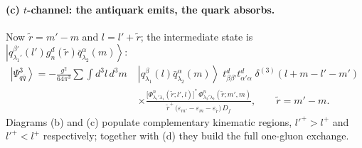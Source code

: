 \documentclass[11pt]{article}
\newcommand{\eps}{\varepsilon}
\newcommand{\dthree}{\delta^{(3)}}
\newcommand{\ket}[1]{\left|#1\right\rangle}
\newcommand{\Ph}{\Phi}
\newcommand{\qk}[3]{q^{#1}_{#2}(#3)}
\newcommand{\aqk}[3]{\bar q^{#1}_{#2}(#3)}
\newcommand{\gl}[3]{g^{#1}_{#2}(#3)}
\begin{document}
\paragraph{(c) $t$-channel: the antiquark emits, the quark absorbs.}
\begin{center}
\end{center}
Now $\tilde r=m'-m$ and $l=l'+\tilde r$; the intermediate state is
$\ket{\qk{\beta'}{\lambda_{1}'}{l'}\gl{d}{n}{\tilde r}\aqk{\alpha}{\lambda_{2}}{m}}$:
\begin{align}
\ket{\Psi^{3}_{q\bar q}}=-\frac{g^{2}}{64\pi^{3}}\sum\int\!d^{3}l\,d^{3}m\;
&\ket{\qk{\beta}{\lambda_{1}}{l}\aqk{\alpha}{\lambda_{2}}{m}}\;
t^{d}_{\beta\beta'}t^{d}_{\alpha'\alpha}\;\dthree(l+m-l'-m')
\nonumber\\&\times
\frac{\big[\Ph^{n}_{\lambda_{1}'\lambda_{1}}(\tilde r;l',l)\big]^{*}\,
\Ph^{n}_{\lambda_{2}'\lambda_{2}}(\tilde r;m',m)}
{\tilde r^{+}\,\big(\eps_{m'}-\eps_{m}-\eps_{\tilde r}\big)\,D_{f}},\qquad \tilde r=m'-m .
\label{eq:E1c}
\end{align}
Diagrams (b) and (c) populate complementary kinematic regions, $l'^{+}>l^{+}$ and
$l'^{+}<l^{+}$ respectively; together with (d) they build the full one-gluon exchange.
\end{document}

